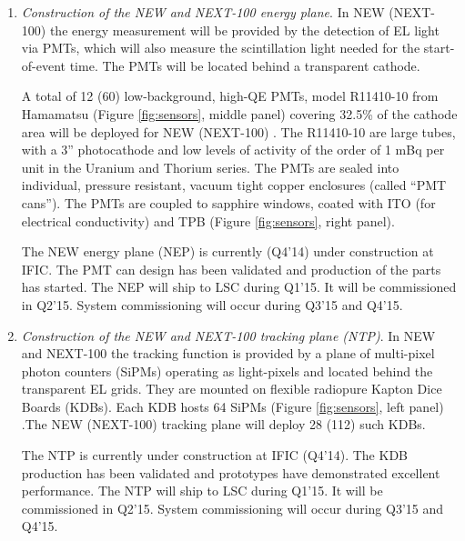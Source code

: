 \begin{enumerate}
\item {\em Construction of the NEW and NEXT-100 energy plane}.
In NEW (NEXT-100) the energy measurement will be provided by the detection of EL light via PMTs, which will also measure the scintillation light needed for the start-of-event time. The PMTs will be located behind a transparent cathode.

A total of 12 (60) low-background, high-QE PMTs, model R11410-10 from Hamamatsu (Figure  \ref{fig:sensors}, middle panel) covering 32.5\% of the cathode area will be deployed for NEW (NEXT-100) . The R11410-10 are large tubes, with a 3'' photocathode and low levels of  activity of the order of 1 mBq per unit in the Uranium and Thorium series. The PMTs are sealed into individual, pressure resistant, vacuum tight copper enclosures (called ``PMT cans''). The PMTs are coupled to 
sapphire windows, coated with ITO (for electrical conductivity) and TPB (Figure  \ref{fig:sensors}, right panel).

The NEW energy plane (NEP) is currently (Q4'14) under construction at IFIC. The PMT can design has been validated and production of the parts has started. The NEP will ship to LSC during Q1'15. It will be commissioned in Q2'15. System commissioning will occur during Q3'15 and Q4'15.

\item  {\em Construction of the NEW and NEXT-100 tracking plane (NTP)}.
In NEW and NEXT-100 the tracking function is provided by a plane of multi-pixel photon counters (SiPMs) operating as light-pixels and located behind the transparent EL grids. They are mounted on flexible radiopure Kapton Dice Boards (KDBs). Each KDB hosts 64 SiPMs (Figure  \ref{fig:sensors}, left panel) .The NEW (NEXT-100) tracking plane will deploy 28 (112) such KDBs. 

The NTP is currently under construction at IFIC (Q4'14). The KDB production has been validated and prototypes have demonstrated excellent performance. The NTP will ship to LSC during Q1'15. It will be commissioned in Q2'15. System commissioning will occur during Q3'15 and Q4'15. 

\end{enumerate}
 

